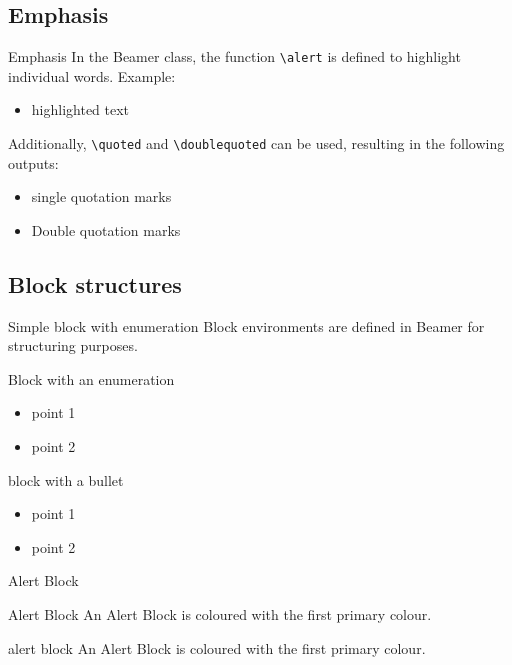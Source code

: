 \documentclass[xcolor={svgnames},12pt,aspectratio=169,handout]{beamer}
\begin{document}
\subsection{Emphasis}

\begin{frame}[fragile]{Emphasis}
    In the Beamer class, the function \lstinline!\alert! is defined to highlight individual words. Example:

    \begin{itemize}
        \item \alert{highlighted text}
    \end{itemize}

    Additionally, \lstinline!\quoted! and \lstinline!\doublequoted! can be used, resulting in the following outputs:

    \begin{itemize}
        \item[] single quotation marks
        \item[] Double quotation marks
    \end{itemize}
\end{frame}

\subsection{Block structures}

\begin{frame}{Simple block with enumeration}
    Block environments are defined in Beamer for structuring purposes.

    \begin{block}{Block with an enumeration}
        \begin{itemize}
            \item point 1
            \item point 2
        \end{itemize}
    \end{block}

    \begin{block}{block with a bullet}
        \begin{itemize}
            \item point 1
            \item point 2
        \end{itemize}
    \end{block}
\end{frame}

\begin{frame}[fragile]{Alert Block}
    \begin{alertblock}{Alert Block}
        An Alert Block is coloured with the first primary colour.
    \end{alertblock}

    \begin{alertblock}{alert block}
    An Alert Block is coloured with the first primary colour.
    \end{alertblock}
\end{frame}
\end{document}
